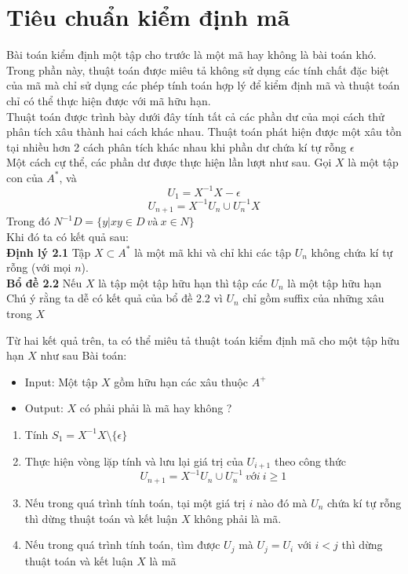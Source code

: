 \documentclass[14pt]{extreport}
\begin{document}
\section{Tiêu chuẩn kiểm định mã}
Bài toán kiểm định một tập cho trước là một mã hay không là bài toán khó. Trong phần này, thuật toán được miêu tả không sử dụng các tính chất đặc biệt của mã mà chỉ sử dụng các phép tính toán hợp lý để kiểm định mã và thuật toán chỉ có thể thực hiện được với mã hữu hạn. \\
Thuật toán được trình bày dưới đây tính tất cả các phần dư của mọi cách thử phân tích xâu thành hai cách khác nhau. Thuật toán phát hiện được một xâu tồn tại nhiều hơn 2 cách phân tích khác nhau khi phần dư chứa kí tự rỗng $\epsilon$\\
Một cách cự thể, các phần dư được thực hiện lần lượt như sau. Gọi $X$ là một tập con của $A^*$, và
$$U_1 = X^{-1} X - \epsilon$$
$$U_{n+1} = X^{-1} U_n \cup U_n^{-1} X$$
Trong đó $N^{-1}D = \{y | xy \in D \ và \ x \in N  \}$ \\
Khi đó ta có kết quả sau: \\
\textbf{Định lý 2.1} Tập $X \subset A^*$ là một mã khi và chỉ khi các tập $U_n$ không chứa kí tự rỗng (với mọi $n$). \\
\textbf{Bổ đề 2.2} Nếu $X$ là tập một tập hữu hạn thì tập các $U_n$ là một tập hữu hạn \\
Chú ý rằng ta dễ có kết quả của bổ đề 2.2 vì $U_n$ chỉ gồm suffix của những xâu trong $X$

Từ hai kết quả trên, ta có thể miêu tả thuật toán kiểm định mã cho một tập hữu hạn $X$ như sau
Bài toán:
\begin{itemize}
\item Input: Một tập $X$ gồm hữu hạn các xâu thuộc $A^+$
\item Output: $X$ có phải phải là mã hay không ?
\end{itemize}

\begin{enumerate}
\item Tính $S_1 = X^{-1}X \setminus \{ \epsilon \}$
\item Thực hiện vòng lặp tính và lưu lại giá trị của $U_{i+1}$ theo công thức
$$U_{n+1} = X^{-1} U_n \cup U_n^{-1} \ với \ i \geq 1$$
\item Nếu trong quá trình tính toán, tại một giá trị $i$ nào đó mà $U_n$ chứa kí tự rỗng thì dừng thuật toán và kết luận $X$ không phải là mã.
\item Nếu trong quá trình tính toán, tìm được $U_j$ mà $U_{j} = U_i$ với $i < j$ thì dừng thuật toán và kết luận $X$ là mã
\end{enumerate}
\end{document}
